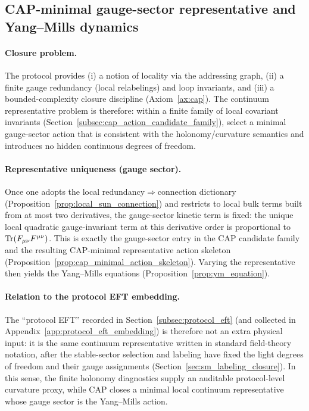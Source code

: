 \subsection{CAP-minimal gauge-sector representative and Yang--Mills dynamics}
\label{subsec:op3_cap_yang_mills_representative}

\paragraph{Closure problem.}
The protocol provides (i) a notion of locality via the addressing graph, (ii) a finite gauge redundancy (local relabelings) and loop invariants, and (iii) a bounded-complexity closure discipline (Axiom~\ref{ax:cap}).
The continuum representative problem is therefore: within a finite family of local covariant invariants (Section~\ref{subsec:cap_action_candidate_family}), select a minimal gauge-sector action that is consistent with the holonomy/curvature semantics and introduces no hidden continuous degrees of freedom.

\paragraph{Representative uniqueness (gauge sector).}
Once one adopts the local redundancy$\Rightarrow$connection dictionary (Proposition~\ref{prop:local_sun_connection}) and restricts to local bulk terms built from at most two derivatives, the gauge-sector kinetic term is fixed:
the unique local quadratic gauge-invariant term at this derivative order is proportional to $\mathrm{Tr}(F_{\mu\nu}F^{\mu\nu})$.
This is exactly the gauge-sector entry in the CAP candidate family and the resulting CAP-minimal representative action skeleton (Proposition~\ref{prop:cap_minimal_action_skeleton}).
Varying the representative then yields the Yang--Mills equations (Proposition~\ref{prop:ym_equation}).

\paragraph{Relation to the protocol EFT embedding.}
The ``protocol EFT'' recorded in Section~\ref{subsec:protocol_eft} (and collected in Appendix~\ref{app:protocol_eft_embedding}) is therefore not an extra physical input: it is the same continuum representative written in standard field-theory notation, after the stable-sector selection and labeling have fixed the light degrees of freedom and their gauge assignments (Section~\ref{sec:sm_labeling_closure}).
In this sense, the finite holonomy diagnostics supply an auditable protocol-level curvature proxy, while CAP closes a minimal local continuum representative whose gauge sector is the Yang--Mills action.


